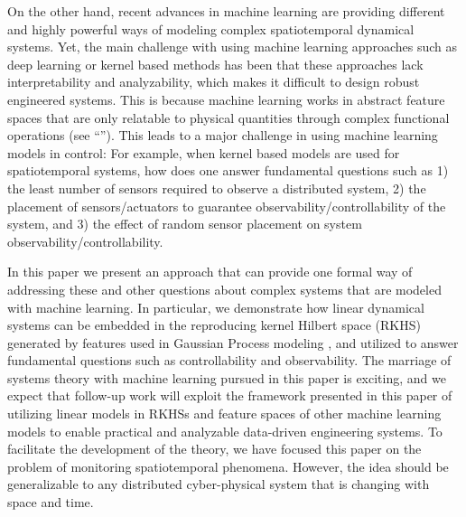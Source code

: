 On the other hand, recent advances in machine learning are providing different and highly powerful ways of modeling complex spatiotemporal dynamical systems.  %
Yet, the main challenge with using machine learning approaches such as deep learning or kernel based methods has been that these approaches lack interpretability and analyzability, which makes it difficult to design robust engineered systems. This is because machine learning works in abstract feature spaces that are only relatable to physical quantities through complex functional operations (see ``''). This leads to a major challenge in using machine learning models in control: For example, when kernel based models are used for spatiotemporal systems, how does one answer fundamental questions such as 1) the least number of sensors required to observe a distributed system, 2) the placement of sensors/actuators to guarantee observability/controllability of the system, and 3) the effect of random sensor placement on system observability/controllability.

In this paper we present an approach that can provide one formal way of addressing these and other questions about complex systems that are modeled with machine learning. In particular, we demonstrate how linear dynamical systems can be embedded in the reproducing kernel Hilbert space (RKHS) \cite{schoelkopf01kernelbased,ams:cucker,kingravi2012reproducing} generated by features used in Gaussian Process modeling \cite{Liu2018csmtutorial,rasmussen2006gaussian}, %
and utilized to answer fundamental questions such as controllability and observability. The marriage of systems theory with machine learning pursued in this paper is exciting, and %
 we expect that follow-up work will exploit the framework presented in this paper of utilizing linear models in RKHSs and feature spaces of other machine learning models to enable practical and analyzable data-driven engineering systems. To facilitate the development of the theory, we have focused this paper on the problem of monitoring spatiotemporal phenomena. However, the idea should be generalizable to any distributed cyber-physical system that is changing with space and time. %

